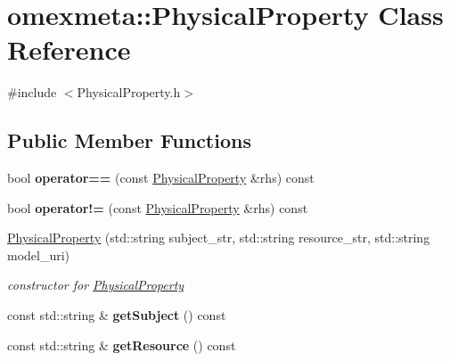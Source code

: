 \hypertarget{classomexmeta_1_1PhysicalProperty}{}\section{omexmeta\+:\+:Physical\+Property Class Reference}
\label{classomexmeta_1_1PhysicalProperty}


{\ttfamily \#include $<$Physical\+Property.\+h$>$}

\subsection*{Public Member Functions}
\begin{DoxyCompactItemize}
\item 
\mbox{\label{classomexmeta_1_1PhysicalProperty_af3b3379a751ebb15f7a5ea0cae8cb4d6}} 
bool {\bfseries operator==} (const \hyperlink{classomexmeta_1_1PhysicalProperty}{Physical\+Property} \&rhs) const
\item 
\mbox{\label{classomexmeta_1_1PhysicalProperty_a1a85ba2c50f5b79e49e8a01b96756f0a}} 
bool {\bfseries operator!=} (const \hyperlink{classomexmeta_1_1PhysicalProperty}{Physical\+Property} \&rhs) const
\item 
\hyperlink{classomexmeta_1_1PhysicalProperty_a76d1ffd15ea6aad76c322bdd8991a111}{Physical\+Property} (std\+::string subject\+\_\+str, std\+::string resource\+\_\+str, std\+::string model\+\_\+uri)
\begin{DoxyCompactList}\small\item\em constructor for \hyperlink{classomexmeta_1_1PhysicalProperty}{Physical\+Property} \end{DoxyCompactList}\item 
\mbox{\label{classomexmeta_1_1PhysicalProperty_acf399e14fd579efc6384ebc677341ead}} 
const std\+::string \& {\bfseries get\+Subject} () const
\item 
\mbox{\label{classomexmeta_1_1PhysicalProperty_a2d60b90270a6ba73646707b8c475fbb1}} 
const std\+::string \& {\bfseries get\+Resource} () const
\item 
\mbox{\label{classomexmeta_1_1PhysicalProperty_a0f27071bfef5a9de4eb89fb21461ba76}} 

\end{DoxyCompactItemize}

